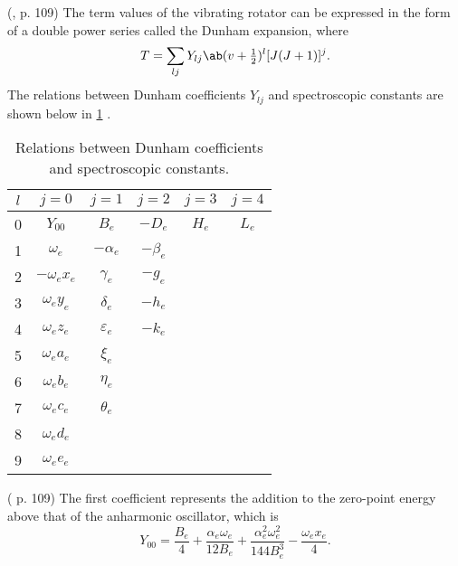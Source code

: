 \documentclass[11pt, twoside, fleqn]{report}
\begin{document}
(\cite{herzbergMolecularSpectraMolecular1950}, p. 109)
The term values of the vibrating rotator can be expressed in the form of a double power series called the Dunham expansion, where
\begin{equation*}
    T = \sum_{lj}Y_{lj}\ab(v + \tfrac{1}{2})^l [J(J + 1)]^j.
\end{equation*}
The relations between Dunham coefficients $Y_{lj}$ and spectroscopic constants are shown below in \cref{t:dunham_coefficients} \cite{babouHighTemperatureNonequilibriumPartition2009}.
\begin{table}[H]
    \centering
    \caption{Relations between Dunham coefficients and spectroscopic constants.}
    \label{t:dunham_coefficients}
    \begin{tabular}{c|ccccc}
        \toprule
        $l$ & $j = 0$            & $j = 1$           & $j = 2$      & $j = 3$ & $j = 4$ \\
        \midrule
        0   & $Y_{00}$           & $B_e$           & $-D_e$     & $H_e$ & $L_e$ \\
        1   & $\omega_e$       & $-\alpha_e$     & $-\beta_e$ &         &         \\
        2   & $-\omega_ex_e$ & $\gamma_e$      & $-g_e$     &         &         \\
        3   & $\omega_ey_e$  & $\delta_e$      & $-h_e$     &         &         \\
        4   & $\omega_ez_e$  & $\varepsilon_e$ & $-k_e$     &         &         \\
        5   & $\omega_ea_e$  & $\xi_e$         &              &         &         \\
        6   & $\omega_eb_e$  & $\eta_e$        &              &         &         \\
        7   & $\omega_ec_e$  & $\theta_e$      &              &         &         \\
        8   & $\omega_ed_e$  &                   &              &         &         \\
        9   & $\omega_ee_e$  &                   &              &         &         \\
        \bottomrule
    \end{tabular}
\end{table}
(\cite{herzbergMolecularSpectraMolecular1950} p. 109)
The first coefficient represents the addition to the zero-point energy above that of the anharmonic oscillator, which is
\begin{equation*}
    Y_{00} = \frac{B_e}{4} + \frac{\alpha_e\omega_e}{12B_e} + \frac{\alpha_e^2\omega_e^2}{144B_e^3} - \frac{\omega_ex_e}{4}.
\end{equation*}
\end{document}
